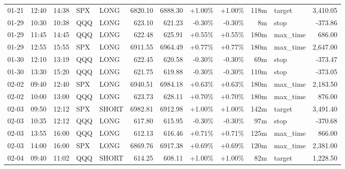 \documentclass[11pt,a4paper]{article}
\begin{document}
\begin{center}
\begin{longtable}{>{\color{txtmain}}l l l l l r r r r r >{\color{txtmain}}l r}
01-21 & 12:40 & 14:38 & SPX & LONG & 6820.10 & 6888.30 & \textcolor{wingreen}{+1.00\%} & \textcolor{wingreen}{+1.00\%} & 118m & target & \textcolor{wingreen}{3,410.05} \\
01-29 & 10:30 & 10:38 & QQQ & LONG & 623.10 & 621.23 & \textcolor{lossred}{-0.30\%} & \textcolor{lossred}{-0.30\%} & 8m & stop & \textcolor{lossred}{-373.86} \\
01-29 & 11:45 & 14:45 & QQQ & LONG & 622.48 & 625.91 & \textcolor{wingreen}{+0.55\%} & \textcolor{wingreen}{+0.55\%} & 180m & max\_time & \textcolor{wingreen}{686.00} \\
01-29 & 12:55 & 15:55 & SPX & LONG & 6911.55 & 6964.49 & \textcolor{wingreen}{+0.77\%} & \textcolor{wingreen}{+0.77\%} & 180m & max\_time & \textcolor{wingreen}{2,647.00} \\
01-30 & 12:10 & 13:19 & QQQ & LONG & 622.45 & 620.58 & \textcolor{lossred}{-0.30\%} & \textcolor{lossred}{-0.30\%} & 69m & stop & \textcolor{lossred}{-373.47} \\
01-30 & 13:30 & 15:20 & QQQ & LONG & 621.75 & 619.88 & \textcolor{lossred}{-0.30\%} & \textcolor{lossred}{-0.30\%} & 110m & stop & \textcolor{lossred}{-373.05} \\
02-02 & 09:40 & 12:40 & SPX & LONG & 6940.51 & 6984.18 & \textcolor{wingreen}{+0.63\%} & \textcolor{wingreen}{+0.63\%} & 180m & max\_time & \textcolor{wingreen}{2,183.50} \\
02-02 & 10:00 & 13:00 & QQQ & LONG & 623.73 & 628.11 & \textcolor{wingreen}{+0.70\%} & \textcolor{wingreen}{+0.70\%} & 180m & max\_time & \textcolor{wingreen}{876.00} \\
02-03 & 09:50 & 12:12 & SPX & SHORT & 6982.81 & 6912.98 & \textcolor{wingreen}{+1.00\%} & \textcolor{wingreen}{+1.00\%} & 142m & target & \textcolor{wingreen}{3,491.40} \\
02-03 & 10:35 & 12:12 & QQQ & LONG & 617.80 & 615.95 & \textcolor{lossred}{-0.30\%} & \textcolor{lossred}{-0.30\%} & 97m & stop & \textcolor{lossred}{-370.68} \\
02-03 & 13:55 & 16:00 & QQQ & LONG & 612.13 & 616.46 & \textcolor{wingreen}{+0.71\%} & \textcolor{wingreen}{+0.71\%} & 125m & max\_time & \textcolor{wingreen}{866.00} \\
02-03 & 14:00 & 16:00 & SPX & LONG & 6869.76 & 6917.38 & \textcolor{wingreen}{+0.69\%} & \textcolor{wingreen}{+0.69\%} & 120m & max\_time & \textcolor{wingreen}{2,381.00} \\
02-04 & 09:40 & 11:02 & QQQ & SHORT & 614.25 & 608.11 & \textcolor{wingreen}{+1.00\%} & \textcolor{wingreen}{+1.00\%} & 82m & target & \textcolor{wingreen}{1,228.50} \\

\end{longtable}
\end{center}
\end{document}
